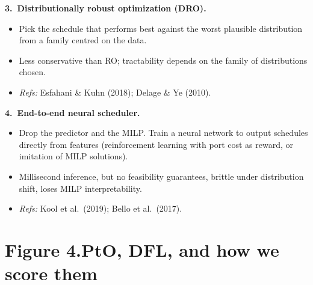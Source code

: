 \documentclass[11pt]{article}
\begin{document}
\vspace{0.4em}

\noindent\textbf{3.\ Distributionally robust optimization (DRO).}
\begin{itemize}[leftmargin=2em, itemsep=0pt]
  \item Pick the schedule that performs best against the worst
        plausible distribution from a family centred on the data.
  \item Less conservative than RO; tractability depends on the family
        of distributions chosen.
  \item \emph{Refs:} Esfahani \& Kuhn (2018); Delage \& Ye (2010).
\end{itemize}

\vspace{0.4em}

\noindent\textbf{4.\ End-to-end neural scheduler.}
\begin{itemize}[leftmargin=2em, itemsep=0pt]
  \item Drop the predictor and the MILP. Train a neural network to
        output schedules directly from features (reinforcement
        learning with port cost as reward, or imitation of MILP
        solutions).
  \item Millisecond inference, but no feasibility guarantees, brittle
        under distribution shift, loses MILP interpretability.
  \item \emph{Refs:} Kool et al.\ (2019); Bello et al.\ (2017).
\end{itemize}

\vspace{0.5em}


\newpage

\section*{Figure 4.\quad PtO, DFL, and how we score them}

\vspace{0.3em}
\end{document}
